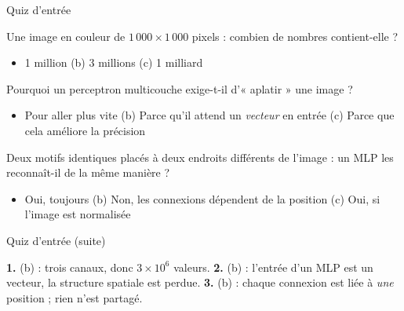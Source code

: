 \begin{frame}{Quiz d'entrée}
\begin{qbox}[Question 1]
Une image en couleur de $1\,000 \times 1\,000$ pixels : combien de nombres
contient-elle ?
\begin{itemize}
  \item[(a)] 1 million \quad (b) 3 millions \quad (c) 1 milliard
\end{itemize}
\end{qbox}
\begin{qbox}[Question 2]
Pourquoi un perceptron multicouche exige-t-il d'« aplatir » une image ?
\begin{itemize}
  \item[(a)] Pour aller plus vite \quad (b) Parce qu'il attend un \emph{vecteur} en entrée
  \quad (c) Parce que cela améliore la précision
\end{itemize}
\end{qbox}
\begin{qbox}[Question 3]
Deux motifs identiques placés à deux endroits différents de l'image :
un MLP les reconnaît-il de la même manière ?
\begin{itemize}
  \item[(a)] Oui, toujours \quad (b) Non, les connexions dépendent de la position
  \quad (c) Oui, si l'image est normalisée
\end{itemize}
\end{qbox}

\end{frame}
\begin{frame}{Quiz d'entrée (suite)}
\begin{solbox}
\textbf{1.} (b) : trois canaux, donc $3 \times 10^6$ valeurs. \quad
\textbf{2.} (b) : l'entrée d'un MLP est un vecteur, la structure spatiale est perdue. \quad
\textbf{3.} (b) : chaque connexion est liée à \emph{une} position ; rien n'est partagé.
\end{solbox}
\end{frame}
